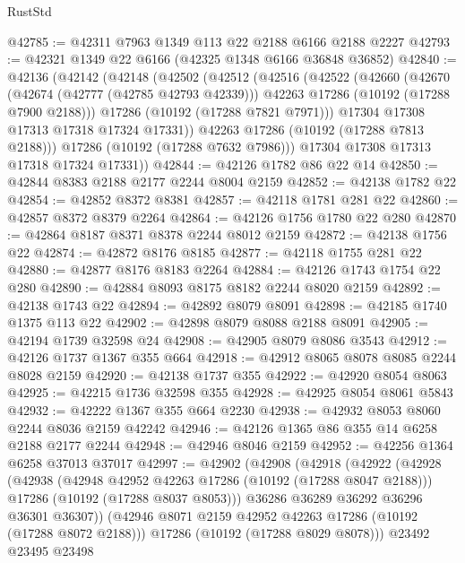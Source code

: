 \begin{lexlean}{RustStd}
\begin{coremodule}
@42785 := @42311 @7963 @1349 @113 @22 @2188 @6166 @2188 @2227
@42793 := @42321 @1349 @22 @6166 (@42325 @1348 @6166 @36848 @36852)
@42840 := @42136
    (@42142
      (@42148
        (@42502
          (@42512
            (@42516
              (@42522
                (@42660
                  (@42670
                    (@42674 (@42777 (@42785 @42793 @42339)))
                    @42263
                    @17286
                    (@10192 (@17288 @7900 @2188)))
                  @17286
                  (@10192 (@17288 @7821 @7971)))
                @17304
                @17308
                @17313
                @17318
                @17324
                @17331))
            @42263
            @17286
            (@10192 (@17288 @7813 @2188)))
          @17286
          (@10192 (@17288 @7632 @7986)))
        @17304
        @17308
        @17313
        @17318
        @17324
        @17331))
@42844 := @42126 @1782 @86 @22 @14
@42850 := @42844 @8383 @2188 @2177 @2244 @8004 @2159
@42852 := @42138 @1782 @22
@42854 := @42852 @8372 @8381
@42857 := @42118 @1781 @281 @22
@42860 := @42857 @8372 @8379 @2264
@42864 := @42126 @1756 @1780 @22 @280
@42870 := @42864 @8187 @8371 @8378 @2244 @8012 @2159
@42872 := @42138 @1756 @22
@42874 := @42872 @8176 @8185
@42877 := @42118 @1755 @281 @22
@42880 := @42877 @8176 @8183 @2264
@42884 := @42126 @1743 @1754 @22 @280
@42890 := @42884 @8093 @8175 @8182 @2244 @8020 @2159
@42892 := @42138 @1743 @22
@42894 := @42892 @8079 @8091
@42898 := @42185 @1740 @1375 @113 @22
@42902 := @42898 @8079 @8088 @2188 @8091
@42905 := @42194 @1739 @32598 @24
@42908 := @42905 @8079 @8086 @3543
@42912 := @42126 @1737 @1367 @355 @664
@42918 := @42912 @8065 @8078 @8085 @2244 @8028 @2159
@42920 := @42138 @1737 @355
@42922 := @42920 @8054 @8063
@42925 := @42215 @1736 @32598 @355
@42928 := @42925 @8054 @8061 @5843
@42932 := @42222 @1367 @355 @664 @2230
@42938 := @42932 @8053 @8060 @2244 @8036 @2159 @42242
@42946 := @42126 @1365 @86 @355 @14 @6258 @2188 @2177 @2244
@42948 := @42946 @8046 @2159
@42952 := @42256 @1364 @6258 @37013 @37017
@42997 := @42902
    (@42908
      (@42918
        (@42922
          (@42928
            (@42938
              (@42948 @42952 @42263 @17286 (@10192 (@17288 @8047 @2188)))
              @17286
              (@10192 (@17288 @8037 @8053)))
            @36286
            @36289
            @36292
            @36296
            @36301
            @36307))
        (@42946 @8071 @2159 @42952 @42263 @17286 (@10192 (@17288 @8072 @2188)))
        @17286
        (@10192 (@17288 @8029 @8078)))
      @23492
      @23495
      @23498

\end{coremodule}
\end{lexlean}
